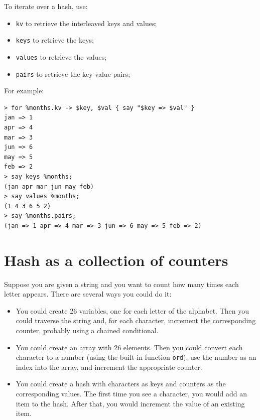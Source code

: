 To iterate over a hash, use:

\begin{itemize}
\item {\tt kv} to retrieve the interleaved keys and values;
\item {\tt keys} to retrieve the keys;
\item {\tt values} to retrieve the values;
\item {\tt pairs} to retrieve the key-value pairs;
\end{itemize}

For example:

\begin{verbatim}
> for %months.kv -> $key, $val { say "$key => $val" }
jan => 1
apr => 4
mar => 3
jun => 6
may => 5
feb => 2
> say keys %months;
(jan apr mar jun may feb)
> say values %months;
(1 4 3 6 5 2)
> say %months.pairs;
(jan => 1 apr => 4 mar => 3 jun => 6 may => 5 feb => 2)
\end{verbatim}
%

\section{Hash as a collection of counters}
\label{histogram}

Suppose you are given a string and you want to count how many
times each letter appears.  There are several ways you could do it:

\begin{itemize}

\item You could create 26 variables, one for each letter of the
alphabet.  Then you could traverse the string and, for each
character, increment the corresponding counter, probably using
a chained conditional.

\item You could create an array with 26 elements.  Then you could
convert each character to a number (using the built-in function
{\tt ord}), use the number as an index into the array, and 
increment the appropriate counter.

\item You could create a hash with characters as keys
and counters as the corresponding values.  The first time you
see a character, you would add an item to the hash.  After
that, you would increment the value of an existing item.

\end{itemize}

